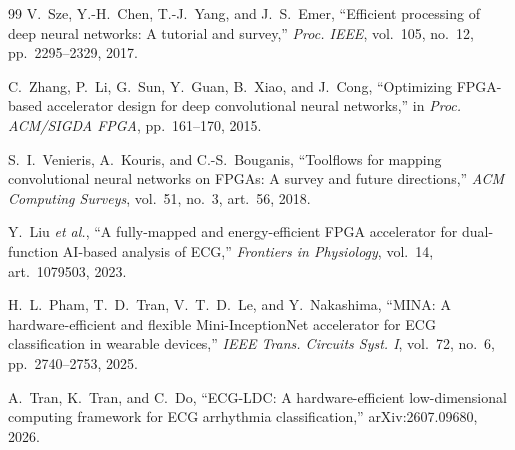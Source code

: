 \documentclass[conference,10pt]{IEEEtran}
\begin{document}
\begin{thebibliography}{99}
V.~Sze, Y.-H.~Chen, T.-J.~Yang, and J.~S.~Emer, ``Efficient processing of deep
neural networks: A tutorial and survey,'' \emph{Proc. IEEE}, vol.~105, no.~12,
pp.~2295--2329, 2017.

C.~Zhang, P.~Li, G.~Sun, Y.~Guan, B.~Xiao, and J.~Cong, ``Optimizing FPGA-based
accelerator design for deep convolutional neural networks,'' in \emph{Proc.
ACM/SIGDA FPGA}, pp.~161--170, 2015.

S.~I.~Venieris, A.~Kouris, and C.-S.~Bouganis, ``Toolflows for mapping
convolutional neural networks on FPGAs: A survey and future directions,''
\emph{ACM Computing Surveys}, vol.~51, no.~3, art.~56, 2018.

Y.~Liu \emph{et al.}, ``A fully-mapped and energy-efficient FPGA accelerator for
dual-function AI-based analysis of ECG,'' \emph{Frontiers in Physiology},
vol.~14, art.~1079503, 2023.

H.~L.~Pham, T.~D.~Tran, V.~T.~D.~Le, and Y.~Nakashima, ``MINA: A
hardware-efficient and flexible Mini-InceptionNet accelerator for ECG
classification in wearable devices,'' \emph{IEEE Trans. Circuits Syst. I},
vol.~72, no.~6, pp.~2740--2753, 2025.

A.~Tran, K.~Tran, and C.~Do, ``ECG-LDC: A hardware-efficient low-dimensional
computing framework for ECG arrhythmia classification,'' arXiv:2607.09680, 2026.

\end{thebibliography}
\end{document}

